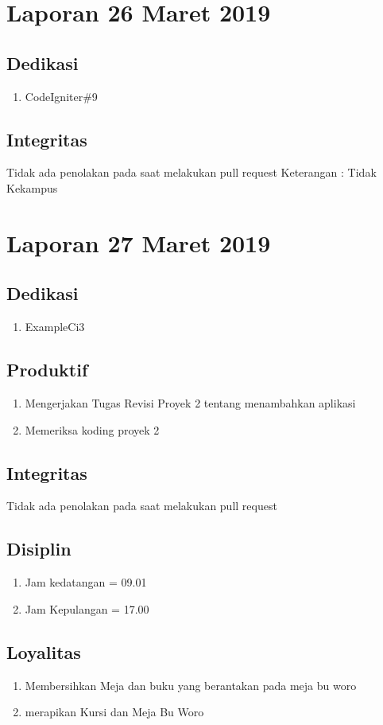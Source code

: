 \section{Laporan 26 Maret 2019}
\subsection{Dedikasi}
\begin{enumerate}
\item CodeIgniter\#9
\end{enumerate}

\subsection{Integritas}
Tidak ada penolakan pada saat melakukan pull request
Keterangan : Tidak Kekampus 

\section{Laporan 27 Maret 2019}
\subsection{Dedikasi}
\begin{enumerate}
\item ExampleCi3
\end{enumerate}
\subsection{Produktif}
\begin{enumerate}
\item Mengerjakan Tugas Revisi Proyek 2 tentang menambahkan aplikasi
\item Memeriksa koding proyek 2
\end{enumerate}
\subsection{Integritas}
Tidak ada penolakan pada saat melakukan pull request
\subsection{Disiplin}
\begin{enumerate}
\item Jam kedatangan =  09.01
\item Jam Kepulangan = 17.00
\end{enumerate}
\subsection{Loyalitas}
\begin{enumerate}
\item Membersihkan Meja dan buku yang berantakan pada meja bu woro
\item merapikan Kursi dan Meja Bu Woro
\end{enumerate}

